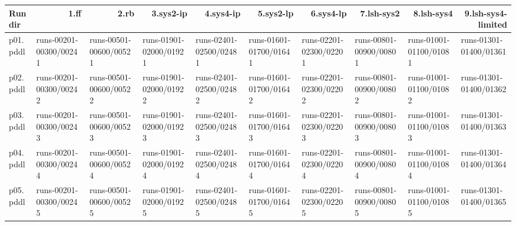 \documentclass{article}
\begin{document}
\begin{tabular}{@{}lrrrrrrrrr@{}}
Run dir & 1.ff & 2.rb & 3.sys2-ip & 4.sys4-ip & 5.sys2-lp & 6.sys4-lp & 7.lsh-sys2 & 8.lsh-sys4 & 9.lsh-sys4-limited \\
\midrule
p01.pddl & \multicolumn{1}{|l|}{runs-00201-00300/00241} & \multicolumn{1}{|l|}{runs-00501-00600/00521} & \multicolumn{1}{|l|}{runs-01901-02000/01921} & \multicolumn{1}{|l|}{runs-02401-02500/02481} & \multicolumn{1}{|l|}{runs-01601-01700/01641} & \multicolumn{1}{|l|}{runs-02201-02300/02201} & \multicolumn{1}{|l|}{runs-00801-00900/00801} & \multicolumn{1}{|l|}{runs-01001-01100/01081} & \multicolumn{1}{|l|}{runs-01301-01400/01361} \\
p02.pddl & \multicolumn{1}{|l|}{runs-00201-00300/00242} & \multicolumn{1}{|l|}{runs-00501-00600/00522} & \multicolumn{1}{|l|}{runs-01901-02000/01922} & \multicolumn{1}{|l|}{runs-02401-02500/02482} & \multicolumn{1}{|l|}{runs-01601-01700/01642} & \multicolumn{1}{|l|}{runs-02201-02300/02202} & \multicolumn{1}{|l|}{runs-00801-00900/00802} & \multicolumn{1}{|l|}{runs-01001-01100/01082} & \multicolumn{1}{|l|}{runs-01301-01400/01362} \\
p03.pddl & \multicolumn{1}{|l|}{runs-00201-00300/00243} & \multicolumn{1}{|l|}{runs-00501-00600/00523} & \multicolumn{1}{|l|}{runs-01901-02000/01923} & \multicolumn{1}{|l|}{runs-02401-02500/02483} & \multicolumn{1}{|l|}{runs-01601-01700/01643} & \multicolumn{1}{|l|}{runs-02201-02300/02203} & \multicolumn{1}{|l|}{runs-00801-00900/00803} & \multicolumn{1}{|l|}{runs-01001-01100/01083} & \multicolumn{1}{|l|}{runs-01301-01400/01363} \\
p04.pddl & \multicolumn{1}{|l|}{runs-00201-00300/00244} & \multicolumn{1}{|l|}{runs-00501-00600/00524} & \multicolumn{1}{|l|}{runs-01901-02000/01924} & \multicolumn{1}{|l|}{runs-02401-02500/02484} & \multicolumn{1}{|l|}{runs-01601-01700/01644} & \multicolumn{1}{|l|}{runs-02201-02300/02204} & \multicolumn{1}{|l|}{runs-00801-00900/00804} & \multicolumn{1}{|l|}{runs-01001-01100/01084} & \multicolumn{1}{|l|}{runs-01301-01400/01364} \\
p05.pddl & \multicolumn{1}{|l|}{runs-00201-00300/00245} & \multicolumn{1}{|l|}{runs-00501-00600/00525} & \multicolumn{1}{|l|}{runs-01901-02000/01925} & \multicolumn{1}{|l|}{runs-02401-02500/02485} & \multicolumn{1}{|l|}{runs-01601-01700/01645} & \multicolumn{1}{|l|}{runs-02201-02300/02205} & \multicolumn{1}{|l|}{runs-00801-00900/00805} & \multicolumn{1}{|l|}{runs-01001-01100/01085} & \multicolumn{1}{|l|}{runs-01301-01400/01365} \\

\end{tabular}
\end{document}
